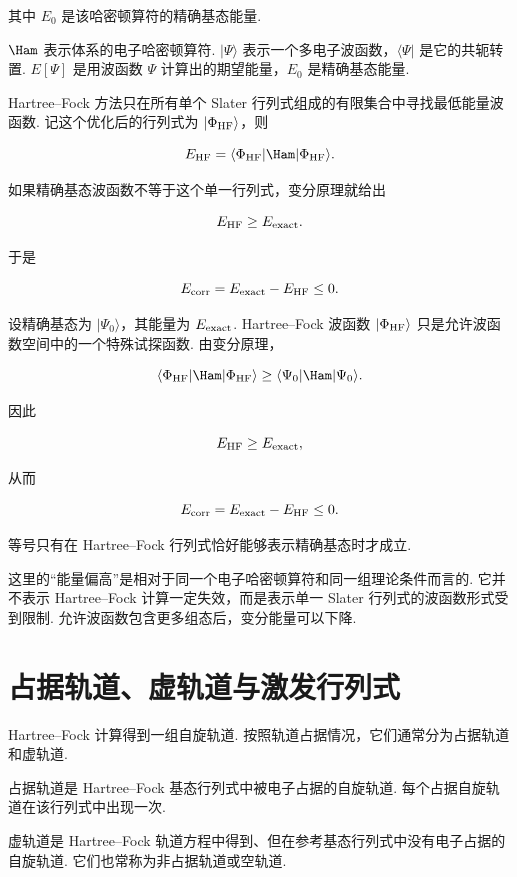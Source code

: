 \documentclass[UTF8,11pt,a4paper,openany]{ctexbook}
\newcommand{\ket}[1]{\lvert #1\rangle}\newcommand{\bra}[1]{\langle #1\rvert}
\begin{document}
其中 $E_0$ 是该哈密顿算符的精确基态能量. 

\begin{notationbox}
$\Ham$ 表示体系的电子哈密顿算符. $\ket{\Psi}$ 表示一个多电子波函数，$\bra{\Psi}$ 是它的共轭转置. $E[\Psi]$ 是用波函数 $\Psi$ 计算出的期望能量，$E_0$ 是精确基态能量. 
\end{notationbox}

Hartree--Fock 方法只在所有单个 Slater 行列式组成的有限集合中寻找最低能量波函数. 记这个优化后的行列式为 $\ket{\Phi_{\rm HF}}$，则

\[
E_{\rm HF}
=
\bra{\Phi_{\rm HF}}\Ham\ket{\Phi_{\rm HF}}.
\]

如果精确基态波函数不等于这个单一行列式，变分原理就给出

\[
E_{\rm HF}\geq E_{\rm exact}.
\]

于是

\[
E_{\rm corr}
=
E_{\rm exact}-E_{\rm HF}
\leq 0.
\]

\begin{derivationbox}
设精确基态为 $\ket{\Psi_0}$，其能量为 $E_{\rm exact}$. Hartree--Fock 波函数 $\ket{\Phi_{\rm HF}}$ 只是允许波函数空间中的一个特殊试探函数. 由变分原理，

\[
\bra{\Phi_{\rm HF}}\Ham\ket{\Phi_{\rm HF}}
\geq
\bra{\Psi_0}\Ham\ket{\Psi_0}.
\]

因此

\[
E_{\rm HF}\geq E_{\rm exact},
\]

从而

\[
E_{\rm corr}=E_{\rm exact}-E_{\rm HF}\leq 0.
\]

等号只有在 Hartree--Fock 行列式恰好能够表示精确基态时才成立. 
\end{derivationbox}

这里的“能量偏高”是相对于同一个电子哈密顿算符和同一组理论条件而言的. 它并不表示 Hartree--Fock 计算一定失效，而是表示单一 Slater 行列式的波函数形式受到限制. 允许波函数包含更多组态后，变分能量可以下降. 

\section{占据轨道、虚轨道与激发行列式}

Hartree--Fock 计算得到一组自旋轨道. 按照轨道占据情况，它们通常分为占据轨道和虚轨道. 

\begin{definitionbox}
占据轨道是 Hartree--Fock 基态行列式中被电子占据的自旋轨道. 每个占据自旋轨道在该行列式中出现一次. 

虚轨道是 Hartree--Fock 轨道方程中得到、但在参考基态行列式中没有电子占据的自旋轨道. 它们也常称为非占据轨道或空轨道. 
\end{definitionbox}
\end{document}
